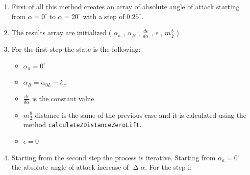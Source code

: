 \begin{enumerate}

\item First of all this method creates an array of absolute angle of attack starting from $\alpha = 0^{\circ}$ to  $\alpha = 20^{\circ}$ with a step of $0.25^{\circ}$.
\item The results array are initialized ( $\alpha_a$ , $\alpha_B$ , $\frac{d\epsilon}{d\alpha}$ ,  $\epsilon$ , $m  \frac{b}{2}$ ). 
\item For the first step the state is the following:

\begin{itemize}
\item $\alpha_a = 0^{\circ}$ 
\item $\alpha_B =\alpha_{0L} - i_w$ 
\item $\frac{d\epsilon}{d\alpha}$  is the constant value 
\item  $m  \frac{b}{2}$  distance is the same of the previous case and it is calculated using the method \texttt{calculateZDistanceZeroLift}. 
\item $\epsilon = 0$ 
\end{itemize}

\item Starting from the second step the process is iterative. Starting from $\alpha_a = 0^{\circ}$ the absolute angle of attack increase of $\upDelta \alpha$. For the step i:



\end{enumerate}

